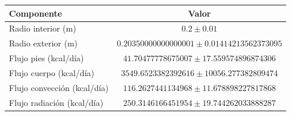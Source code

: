 \begin{tabular}{l c}
\hline
Componente & Valor \\
\hline
Radio interior (m) & $ 0.2 \pm 0.01 $ \\
Radio exterior (m) & $ 0.20350000000000001 \pm 0.01414213562373095 $ \\
Flujo pies (kcal/día) & $ 41.70477778675007 \pm 17.559574896874306 $ \\
Flujo cuerpo (kcal/día) & $ 3549.6523382392616 \pm 10056.277382809474 $ \\
Flujo convección (kcal/día) & $ 116.2627441134968 \pm 11.678898227817868 $ \\
Flujo radiación (kcal/día) & $ 250.3146166451954 \pm 19.744262033888287 $ \\
\hline
\end{tabular}
